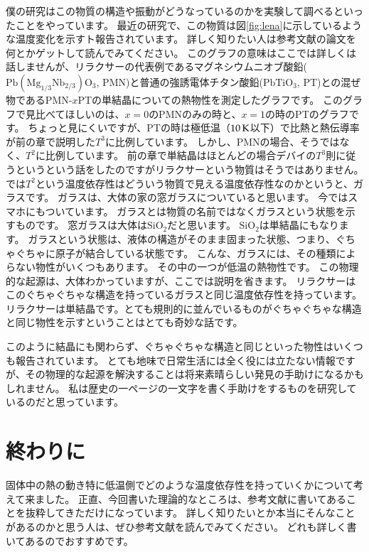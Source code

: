 \documentclass[10pt,b5paper,papersize,dvipdfmx]{jsbook}
\begin{document}
僕の研究はこの物質の構造や振動がどうなっているのかを実験して調べるといったことをやっています。
最近の研究で、この物質は図\ref{fig:lena}に示しているような温度変化を示すト報告されています。
詳しく知りたい人は参考文献\cite{relaxCT}の論文を何とかゲットして読んでみてください。
このグラフの意味はここでは詳しくは話しませんが、リラクサーの代表例であるマグネシウムニオブ酸鉛($\mathrm{Pb(Mg_{1/3}Nb_{2/3})O_3}$, PMN)と普通の強誘電体チタン酸鉛($\mathrm{PbTiO_3}$, PT)との混ぜ物であるPMN-$x$PTの単結晶についての熱物性を測定したグラフです。
このグラフで見比べてほしいのは、$x = 0$のPMNのみの時と、$x = 1$の時のPTのグラフです。
ちょっと見にくいですが、PTの時は極低温（$10\tani{K}$以下）で比熱と熱伝導率が前の章で説明した$T^3$に比例しています。
しかし、PMNの場合、そうではなく、$T^2$に比例しています。
前の章で単結晶はほとんどの場合デバイの$T^3$則に従うというという話をしたのですがリラクサーという物質はそうではありません。
では$T^2$という温度依存性はどういう物質で見える温度依存性なのかというと、ガラスです。
ガラスは、大体の家の窓ガラスについていると思います。
今ではスマホにもついています。
ガラスとは物質の名前ではなくガラスという状態を示すものです。
窓ガラスは大体は$\mathrm{SiO}_2$だと思います。
$\mathrm{SiO}_2$は単結晶にもなります。
ガラスという状態は、液体の構造がそのまま固まった状態、つまり、ぐちゃぐちゃに原子が結合している状態です。
こんな、ガラスには、その種類によらない物性がいくつもあります。
その中の一つが低温の熱物性です。
この物理的な起源は、大体わかっていますが、ここでは説明を省きます。
リラクサーはこのぐちゃぐちゃな構造を持っているガラスと同じ温度依存性を持っています。リラクサーは単結晶です。とても規則的に並んでいるものがぐちゃぐちゃな構造と同じ物性を示すということはとても奇妙な話です。\par
このように結晶にも関わらず、ぐちゃぐちゃな構造と同じといった物性はいくつも報告されています。
とても地味で日常生活には全く役には立たない情報ですが、その物理的な起源を解決することは将来素晴らしい発見の手助けになるかもしれません。
私は歴史の一ページの一文字を書く手助けをするものを研究しているのだと思っています。


\section{終わりに}
固体中の熱の動き特に低温側でどのような温度依存性を持っていくかについて考えて来ました。
正直、今回書いた理論的なところは、参考文献に書いてあることを抜粋してきただけになっています。
詳しく知りたいとか本当にそんなことがあるのかと思う人は、ぜひ参考文献を読んでみてください。
どれも詳しく書いてあるのでおすすめです。
\end{document}

